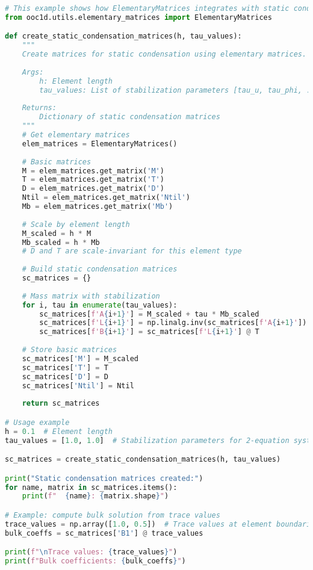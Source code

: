 \begin{lstlisting}[language=Python, caption=Static Condensation Integration Example]
# This example shows how ElementaryMatrices integrates with static condensation
from ooc1d.utils.elementary_matrices import ElementaryMatrices

def create_static_condensation_matrices(h, tau_values):
    """
    Create matrices for static condensation using elementary matrices.
    
    Args:
        h: Element length
        tau_values: List of stabilization parameters [tau_u, tau_phi, ...]
    
    Returns:
        Dictionary of static condensation matrices
    """
    # Get elementary matrices
    elem_matrices = ElementaryMatrices()
    
    # Basic matrices
    M = elem_matrices.get_matrix('M')
    T = elem_matrices.get_matrix('T')
    D = elem_matrices.get_matrix('D')
    Ntil = elem_matrices.get_matrix('Ntil')
    Mb = elem_matrices.get_matrix('Mb')
    
    # Scale by element length
    M_scaled = h * M
    Mb_scaled = h * Mb
    # D and T are scale-invariant for this element type
    
    # Build static condensation matrices
    sc_matrices = {}
    
    # Mass matrix with stabilization
    for i, tau in enumerate(tau_values):
        sc_matrices[f'A{i+1}'] = M_scaled + tau * Mb_scaled
        sc_matrices[f'L{i+1}'] = np.linalg.inv(sc_matrices[f'A{i+1}'])
        sc_matrices[f'B{i+1}'] = sc_matrices[f'L{i+1}'] @ T
    
    # Store basic matrices
    sc_matrices['M'] = M_scaled
    sc_matrices['T'] = T
    sc_matrices['D'] = D
    sc_matrices['Ntil'] = Ntil
    
    return sc_matrices

# Usage example
h = 0.1  # Element length
tau_values = [1.0, 1.0]  # Stabilization parameters for 2-equation system

sc_matrices = create_static_condensation_matrices(h, tau_values)

print("Static condensation matrices created:")
for name, matrix in sc_matrices.items():
    print(f"  {name}: {matrix.shape}")

# Example: compute bulk solution from trace values
trace_values = np.array([1.0, 0.5])  # Trace values at element boundaries
bulk_coeffs = sc_matrices['B1'] @ trace_values

print(f"\nTrace values: {trace_values}")
print(f"Bulk coefficients: {bulk_coeffs}")
\end{lstlisting}

